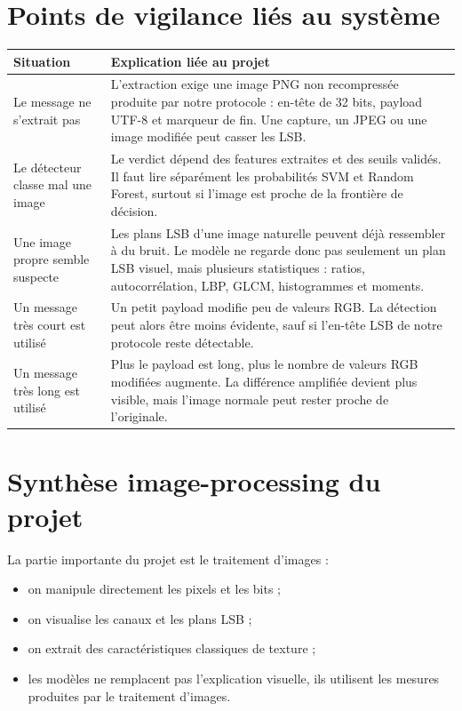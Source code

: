 \documentclass[11pt,a4paper]{article}
\begin{document}
\section{Points de vigilance liés au système}
\begin{longtable}{p{5cm}p{9cm}}
\toprule
Situation & Explication liée au projet \\
\midrule
Le message ne s'extrait pas & L'extraction exige une image PNG non recompressée produite par notre protocole : en-tête de 32 bits, payload UTF-8 et marqueur de fin. Une capture, un JPEG ou une image modifiée peut casser les LSB. \\
Le détecteur classe mal une image & Le verdict dépend des features extraites et des seuils validés. Il faut lire séparément les probabilités SVM et Random Forest, surtout si l'image est proche de la frontière de décision. \\
Une image propre semble suspecte & Les plans LSB d'une image naturelle peuvent déjà ressembler à du bruit. Le modèle ne regarde donc pas seulement un plan LSB visuel, mais plusieurs statistiques : ratios, autocorrélation, LBP, GLCM, histogrammes et moments. \\
Un message très court est utilisé & Un petit payload modifie peu de valeurs RGB. La détection peut alors être moins évidente, sauf si l'en-tête LSB de notre protocole reste détectable. \\
Un message très long est utilisé & Plus le payload est long, plus le nombre de valeurs RGB modifiées augmente. La différence amplifiée devient plus visible, mais l'image normale peut rester proche de l'originale. \\
\bottomrule
\end{longtable}

\section{Synthèse image-processing du projet}
La partie importante du projet est le traitement d'images :
\begin{itemize}
  \item on manipule directement les pixels et les bits ;
  \item on visualise les canaux et les plans LSB ;
  \item on extrait des caractéristiques classiques de texture ;
  \item les modèles ne remplacent pas l'explication visuelle, ils utilisent les mesures produites par le traitement d'images.
\end{itemize}
\end{document}
